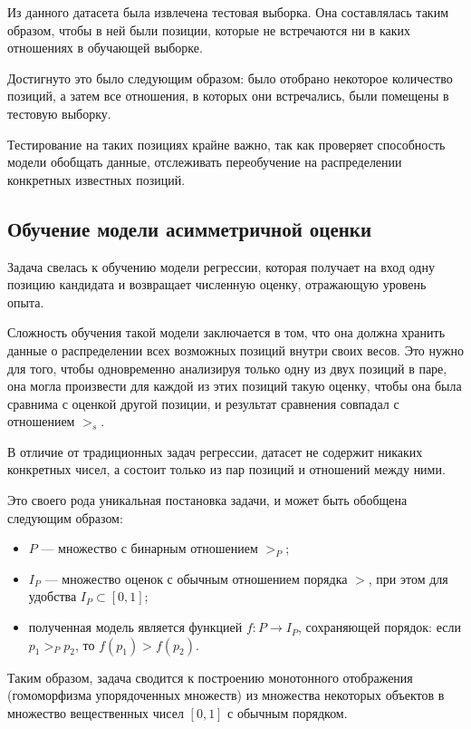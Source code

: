 \documentclass[14pt]{mmcs_article}
\begin{document}
  Из данного датасета была извлечена тестовая выборка. Она составлялась таким образом, чтобы в ней были позиции, которые не встречаются ни в каких отношениях в обучающей выборке.

  Достигнуто это было следующим образом: было отобрано некоторое количество позиций, а затем все отношения, в которых они встречались, были помещены в тестовую выборку.

  Тестирование на таких позициях крайне важно, так как проверяет способность модели обобщать данные, отслеживать переобучение на распределении конкретных известных позиций.

  \subsection{Обучение модели асимметричной оценки}

  Задача свелась к обучению модели регрессии, которая получает на вход одну позицию кандидата и возвращает численную оценку, отражающую уровень опыта.

  Сложность обучения такой модели заключается в том, что она должна хранить данные о распределении всех возможных позиций внутри своих весов. Это нужно для того, чтобы одновременно анализируя только одну из двух позиций в паре, она могла произвести для каждой из этих позиций такую оценку, чтобы она была сравнима с оценкой другой позиции, и результат сравнения совпадал с отношением $>_{s}$.

  В отличие от традиционных задач регрессии, датасет не содержит никаких конкретных чисел, а состоит только из пар позиций и отношений между ними.

  Это своего рода уникальная постановка задачи, и может быть обобщена следующим образом:

  \begin{itemize}
    \item $P$ --- множество с бинарным отношением $>_{P}$;
    \item $I_{P}$ --- множество оценок с обычным отношением порядка $>$, при этом для удобства $I_{P} \subset [0, 1]$;
    \item полученная модель является функцией $f: P \rightarrow I_{P}$, сохраняющей порядок: если $p_{1} >_{P} p_{2}$, то $f(p_{1}) > f(p_{2})$.
  \end{itemize}

  Таким образом, задача сводится к построению монотонного отображения (гомоморфизма упорядоченных множеств) из множества некоторых объектов в множество вещественных чисел $[0, 1]$ с обычным порядком.
\end{document}
